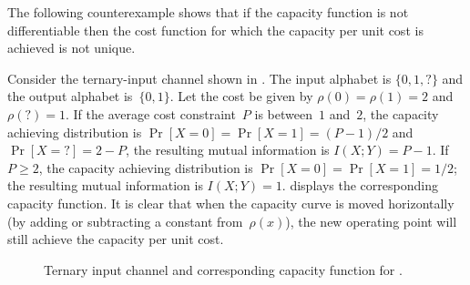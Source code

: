 The following counterexample shows that if the capacity function is not
differentiable then the cost function for which the capacity per unit cost is
achieved is not unique.

\begin{example}
  \label{ex:nondiffcapacity}
  Consider the ternary-input channel shown in . The input
  alphabet is $\{0,1,?\}$ and the output alphabet is~$\{0,1\}$. Let the cost be
  given by $\rho(0) = \rho(1) = 2$ and $\rho(?) = 1$. If the average cost
  constraint~$P$ is between~$1$ and~$2$, the capacity achieving distribution is
  $\Pr[X=0] = \Pr[X=1] = (P-1)/2$ and $\Pr[X = ?] = 2 - P$, the resulting mutual
  information is $I(X;Y) = P - 1$. If $P \ge 2$, the capacity achieving
  distribution is $\Pr[X=0] = \Pr[X = 1] = 1/2$; the resulting mutual
  information is $I(X;Y) = 1$.  displays the corresponding
  capacity function. It is clear that when the capacity curve is moved
  horizontally (by adding or subtracting a constant from~$\rho(x)$), the new
  operating point will still achieve the capacity per unit cost.
  \begin{figure}
    \centerline{%
      \hfil
      }%
    \caption{Ternary input channel and corresponding capacity function for
    .}
    \label{fig:ternaryinputch}
  \end{figure}
\end{example}

